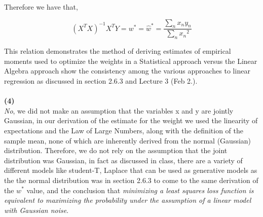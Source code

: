 \documentclass[submit]{harvardml}
\begin{document}
\begin{tcolorbox}[breakable]
Therefore we have that, 

$$ (X^TX)^{-1}X^TY = w^{*} = \hat{w}^{*} = \frac{\sum\limits_n x_n y_n}{\sum\limits_n {x_n}^2}$$

This relation demonstrates the method of deriving estimates of empirical moments used to optimize the weights in a Statistical approach versus the Linear Algebra approach show the consistency among the various approaches to linear regression as discussed in section 2.6.3 and Lecture 3 (Feb 2.).\\\\

\textbf{(4)}\\

\textit{No}, we did not make an assumption that the variables x and y are jointly Gaussian, in our derivation of the estimate for the weight we used the linearity of expectations and the Law of Large Numbers, along with the definition of the sample mean, none of which are inherently derived from the normal (Gaussian) distribution. Therefore, we do not rely on the assumption that the joint distribution was Gaussian, in fact as discussed in class, there are a variety of different models like student-T, Laplace that can be used as generative models as the the normal distribution was in  section 2.6.3 to come to the same derivation of the $w^{*}$ value, and the conclusion that \textit{minimizing a least squares loss function is equivalent to maximizing the probability under the
assumption of a linear model with Gaussian noise}.



\end{tcolorbox}


\end{document}
